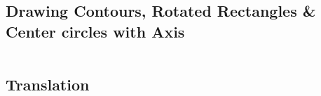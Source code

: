 \documentclass[a4paper, 10pt]{article}
\begin{document}
\begin{lstlisting}[language = C++]

\end{lstlisting}


\subsection{Drawing Contours, Rotated Rectangles \& Center circles with Axis}


\begin{lstlisting}[language = C++]

\end{lstlisting}


\subsection{Translation}


\begin{lstlisting}[language = C++]

\end{lstlisting}

\end{document}
